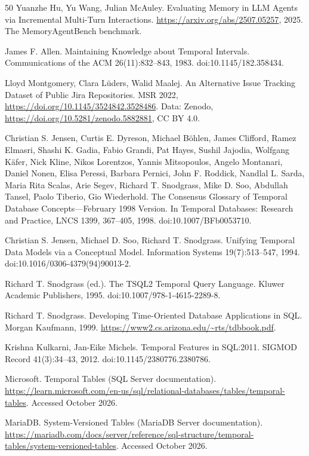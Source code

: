 \documentclass[sigconf, nonacm]{acmart}
\begin{document}
\begin{thebibliography}{50}
Yuanzhe Hu, Yu Wang, Julian McAuley. Evaluating Memory in LLM Agents via Incremental Multi-Turn Interactions. \url{https://arxiv.org/abs/2507.05257}, 2025. The MemoryAgentBench benchmark.

James F. Allen. Maintaining Knowledge about Temporal Intervals. Communications of the ACM 26(11):832--843, 1983. doi:10.1145/182.358434.

Lloyd Montgomery, Clara Lüders, Walid Maalej. An Alternative Issue Tracking Dataset of Public Jira Repositories. MSR 2022, \url{https://doi.org/10.1145/3524842.3528486}. Data: Zenodo, \url{https://doi.org/10.5281/zenodo.5882881}, CC BY 4.0.

Christian S. Jensen, Curtis E. Dyreson, Michael B\"ohlen, James Clifford, Ramez Elmasri, Shashi K. Gadia, Fabio Grandi, Pat Hayes, Sushil Jajodia, Wolfgang K\"afer, Nick Kline, Nikos Lorentzos, Yannis Mitsopoulos, Angelo Montanari, Daniel Nonen, Elisa Peressi, Barbara Pernici, John F. Roddick, Nandlal L. Sarda, Maria Rita Scalas, Arie Segev, Richard T. Snodgrass, Mike D. Soo, Abdullah Tansel, Paolo Tiberio, Gio Wiederhold. The Consensus Glossary of Temporal Database Concepts---February 1998 Version. In Temporal Databases: Research and Practice, LNCS 1399, 367--405, 1998. doi:10.1007/BFb0053710.

Christian S. Jensen, Michael D. Soo, Richard T. Snodgrass. Unifying Temporal Data Models via a Conceptual Model. Information Systems 19(7):513--547, 1994. doi:10.1016/0306-4379(94)90013-2.

Richard T. Snodgrass (ed.). The TSQL2 Temporal Query Language. Kluwer Academic Publishers, 1995. doi:10.1007/978-1-4615-2289-8.

Richard T. Snodgrass. Developing Time-Oriented Database Applications in SQL. Morgan Kaufmann, 1999. \url{https://www2.cs.arizona.edu/~rts/tdbbook.pdf}.

Krishna Kulkarni, Jan-Eike Michels. Temporal Features in SQL:2011. SIGMOD Record 41(3):34--43, 2012. doi:10.1145/2380776.2380786.

Microsoft. Temporal Tables (SQL Server documentation). \url{https://learn.microsoft.com/en-us/sql/relational-databases/tables/temporal-tables}. Accessed October 2026.

MariaDB. System-Versioned Tables (MariaDB Server documentation). \url{https://mariadb.com/docs/server/reference/sql-structure/temporal-tables/system-versioned-tables}. Accessed October 2026.


\end{thebibliography}
\end{document}
